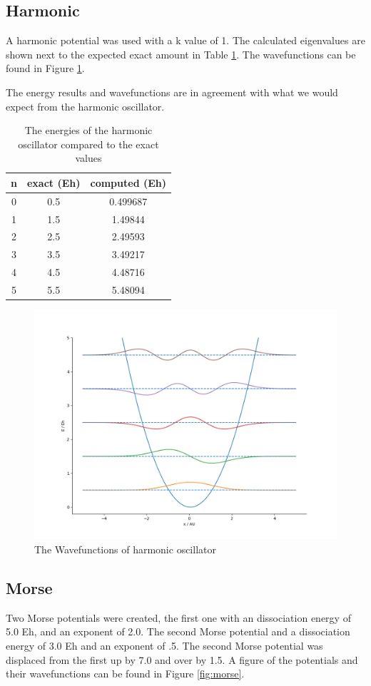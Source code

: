 \documentclass{article}
\begin{document}
\newpage
\subsection*{Harmonic}
A harmonic potential was used with a k value of 1. The calculated eigenvalues are shown next to the expected exact amount in Table \ref{tab:harm}. The wavefunctions can be found in Figure \ref{fig:harm}.

The energy results and wavefunctions are in agreement with what we would expect from the harmonic oscillator.

\begin{table}[h]
\centering
\begin{tabular}{ |c|c|c|}
\hline
n & exact (Eh) & computed (Eh) \\
\hline
0 & 0.5& 0.499687\\
1 & 1.5& 1.49844 \\
2 & 2.5& 2.49593 \\
3 & 3.5& 3.49217 \\
4 & 4.5& 4.48716 \\
5 & 5.5& 5.48094 \\
\hline
\end{tabular}
\caption{The energies of the harmonic oscillator compared to the exact values}
\label{tab:harm}
\end{table}

\begin{figure}[h]
\centering
	\includegraphics[width=.75\linewidth]{images/harm.png}
	\caption{The Wavefunctions of harmonic oscillator  }
	\label{fig:harm}
\end{figure}

\newpage
\subsection*{Morse}
Two Morse potentials were created, the first one with an dissociation energy of 5.0 Eh, and an exponent of 2.0. The second Morse potential and a dissociation energy of 3.0 Eh and an exponent of .5. The second Morse potential was displaced from the first up by 7.0 and over by 1.5. A figure of the potentials and their wavefunctions can be found in Figure \ref{fig:morse}.
 
\end{document}
